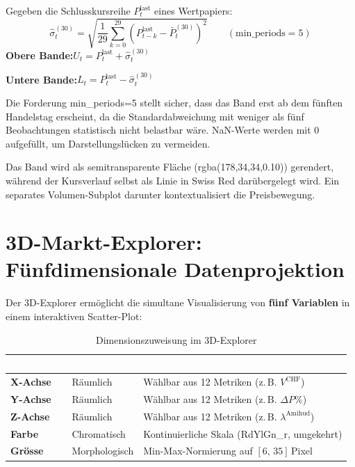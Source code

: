 \documentclass[11pt, a4paper, oneside, openany]{report}
\newcommand{\code}[1]{{\codefont\small\textcolor{DeepNavy}{#1}}}
\begin{document}
\begin{mathbox}
Gegeben die Schlusskursreihe $P_t^{\text{last}}$ eines Wertpapiers:
\[
  \hat{\sigma}_t^{(30)} = \sqrt{\frac{1}{29}\sum_{k=0}^{29}\left(P_{t-k}^{\text{last}} - \bar{P}_t^{(30)}\right)^2} \qquad (\text{min\_periods} = 5)
\]
\textbf{Obere Bande:}\;$U_t = P_t^{\text{last}} + \hat{\sigma}_t^{(30)}$

\textbf{Untere Bande:}\;$L_t = P_t^{\text{last}} - \hat{\sigma}_t^{(30)}$

Die Forderung \code{min\_periods=5} stellt sicher, dass das Band erst ab dem fünften Handelstag erscheint, da die Standardabweichung mit weniger als fünf Beobachtungen statistisch nicht belastbar wäre. NaN-Werte werden mit 0 aufgefüllt, um Darstellungslücken zu vermeiden.

Das Band wird als semitransparente Fläche (\code{rgba(178,34,34,0.10)}) gerendert, während der Kursverlauf selbst als Linie in Swiss Red darübergelegt wird. Ein separates Volumen-Subplot darunter kontextualisiert die Preisbewegung.
\end{mathbox}

\section{3D-Markt-Explorer: Fünfdimensionale Datenprojektion}
\label{sec:3d}

Der 3D-Explorer ermöglicht die simultane Visualisierung von \textbf{fünf Variablen} in einem interaktiven Scatter-Plot:

\begin{table}[H]
\centering
\caption{Dimensionszuweisung im 3D-Explorer}
\label{tab:3d}
\sffamily\small
\begin{tabularx}{\textwidth}{>{\bfseries}l l X}
  \toprule
  \rowcolor{DeepNavy} \textcolor{white}{\textbf{Dimension}} & \textcolor{white}{\textbf{Kanal}} & \textcolor{white}{\textbf{Beschreibung}} \\
  \midrule
  X-Achse  & Räumlich      & Wählbar aus 12 Metriken (z.\,B. $V^{\text{CHF}}$) \\
  Y-Achse  & Räumlich      & Wählbar aus 12 Metriken (z.\,B. $\Delta P\%$) \\
  Z-Achse  & Räumlich      & Wählbar aus 12 Metriken (z.\,B. $\lambda^{\text{Amihud}}$) \\
  Farbe    & Chromatisch   & Kontinuierliche Skala (RdYlGn\_r, umgekehrt) \\
  Grösse   & Morphologisch & Min-Max-Normierung auf $[6,\,35]$\,Pixel \\
  \bottomrule
\end{tabularx}
\end{table}
\end{document}
